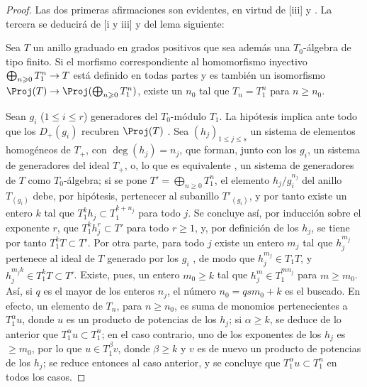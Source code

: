 \documentclass[oneside,10pt]{amsart}
\makeatletter
\renewcommand{\leq}{\leqslant}
\renewcommand{\geq}{\geqslant}
\newcommand{\ega@arrow}[2]{\mathchoice{#1}{#2}{#2}{#2}}
\renewcommand{\to}{\ega@arrow{\longrightarrow}{\rightarrow}}
\newcommand{\oldpage}[2][]{\marginnote{\normalfont\footnotesize\textbf{#1}~|~#2}\ignorespaces}
\let\EGAOriginalLabel\label
\renewcommand{\label}[1]{\phantomsection\EGAOriginalLabel{#1}}
\makeatother
\begin{document}
\begin{proof}
Las dos primeras afirmaciones son evidentes, en virtud de [iii] y .
La tercera se deducirá de [i y iii] y del lema siguiente:
\begin{lemma}[8.2.14.1]
\label{II.8.2.14.1}
Sea $T$ un anillo graduado en grados positivos que sea además una $T_0$-álgebra de tipo finito.
Si el morfismo correspondiente al homomorfismo inyectivo $\bigoplus_{n\geq0}T_1^n\to T$ está definido en todas partes y es también un isomorfismo $\Proj(T)\to\Proj(\bigoplus_{n\geq0}T_1^n)$, existe un $n_0$ tal que $T_n=T_1^n$ para $n\geq n_0$.
\end{lemma}

Sean $g_i$ ($1\leq i\leq r$) generadores del $T_0$-módulo $T_1$.
La hipótesis implica ante todo que los $D_+(g_i)$ recubren $\Proj(T)$ .
Sea $(h_j)_{1\leq j\leq s}$ un sistema de elementos homogéneos de $T_+$, con $\deg(h_j)=n_j$, que forman, junto con los $g_i$, un sistema de generadores del ideal $T_+$, o, lo que es equivalente , un sistema de generadores de $T$ como $T_0$-álgebra;
si se pone $T'=\bigoplus_{n\geq0}T_1^n$, el elemento $h_j/g_i^{n_j}$ del anillo $T_{(g_i)}$ debe, por hipótesis, pertenecer al subanillo $T'_{(g_i)}$, y por tanto existe un entero $k$ tal que $T_1^k h_j\subset T_1^{k+n_j}$ para todo $j$.
Se concluye así, por inducción sobre el exponente $r$, que $T_1^k h_j^r \subset T'$ para todo $r\geq1$, y, por definición de los $h_j$, se tiene por tanto $T_1^k T\subset T'$.
Por otra parte, para todo $j$ existe un entero $m_j$ tal que $h_j^{m_j}$ pertenece al ideal de $T$ generado por los $g_i$ , de modo que $h_j^{m_j}\in T_1 T$, y
\oldpage[II]{162}
$h_j^{m_j k}\in T_1^k T\subset T'$.
Existe, pues, un entero $m_0\geq k$ tal que $h_j^m\in T_1^{m n_j}$ para $m\geq m_0$.
Así, si $q$ es el mayor de los enteros $n_j$, el número $n_0=q s m_0+k$ es el buscado.
En efecto, un elemento de $T_n$, para $n\geq n_0$, es suma de monomios pertenecientes a $T_1^\alpha u$, donde $u$ es un producto de potencias de los $h_j$;
si $\alpha\geq k$, se deduce de lo anterior que $T_1^\alpha u\subset T_1^n$;
en el caso contrario, uno de los exponentes de los $h_j$ es $\geq m_0$, por lo que $u\in T_1^\beta v$, donde $\beta\geq k$ y $v$ es de nuevo un producto de potencias de los $h_j$;
se reduce entonces al caso anterior, y se concluye que $T_1^\alpha u\subset T_1^n$ en todos los casos.
\end{proof}
\end{document}
